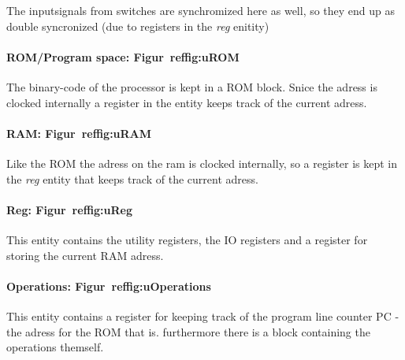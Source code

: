The inputsignals from switches are synchromized here as well, so they end up as
double syncronized (due to registers in the \emph{reg} enitity)

\paragraph{ROM/Program space: Figur~ref{fig:uROM}}
The binary-code of the processor is kept in a ROM block. Snice the adress is
clocked internally a register in the  entity keeps track of the
current adress.

\paragraph{RAM: Figur~ref{fig:uRAM}}
Like the ROM the adress on the ram is clocked internally, so a register is kept
in the \emph{reg} entity that keeps track of the current adress.

\paragraph{Reg: Figur~ref{fig:uReg}}
This entity contains the utility registers, the IO registers and a register for
storing the current RAM adress.

\paragraph{Operations: Figur~ref{fig:uOperations}}
This entity contains a register for keeping track of the program line counter
PC - the adress for the ROM that is. furthermore there is a block containing the
operations themself.



